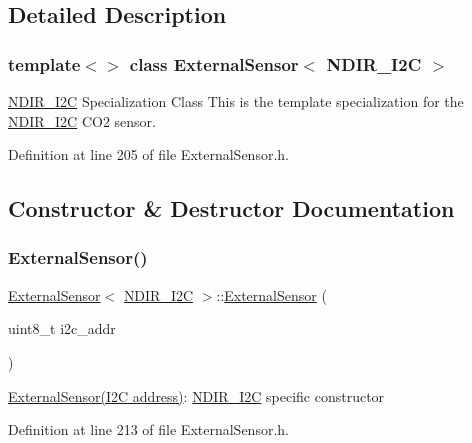 \subsection{Detailed Description}
\subsubsection*{template$<$$>$\newline
class External\+Sensor$<$ N\+D\+I\+R\+\_\+\+I2\+C $>$}

\hyperlink{class_n_d_i_r___i2_c}{N\+D\+I\+R\+\_\+\+I2C} Specialization Class This is the template specialization for the \hyperlink{class_n_d_i_r___i2_c}{N\+D\+I\+R\+\_\+\+I2C} C\+O2 sensor. 

Definition at line 205 of file External\+Sensor.\+h.



\subsection{Constructor \& Destructor Documentation}
\mbox{\label{class_external_sensor_3_01_n_d_i_r___i2_c_01_4_aa06970ea689679c0e1deb5360e05a0a4}} 
\subsubsection{\texorpdfstring{External\+Sensor()}{ExternalSensor()}}
{\footnotesize\ttfamily \hyperlink{class_external_sensor}{External\+Sensor}$<$ \hyperlink{class_n_d_i_r___i2_c}{N\+D\+I\+R\+\_\+\+I2C} $>$\+::\hyperlink{class_external_sensor}{External\+Sensor} (\begin{DoxyParamCaption}\item[{uint8\+\_\+t}]{i2c\+\_\+addr }\end{DoxyParamCaption})\hspace{0.3cm}{\ttfamily [inline]}}

\hyperlink{class_external_sensor}{External\+Sensor(\+I2\+C address)}\+: \hyperlink{class_n_d_i_r___i2_c}{N\+D\+I\+R\+\_\+\+I2C} specific constructor 

Definition at line 213 of file External\+Sensor.\+h.


